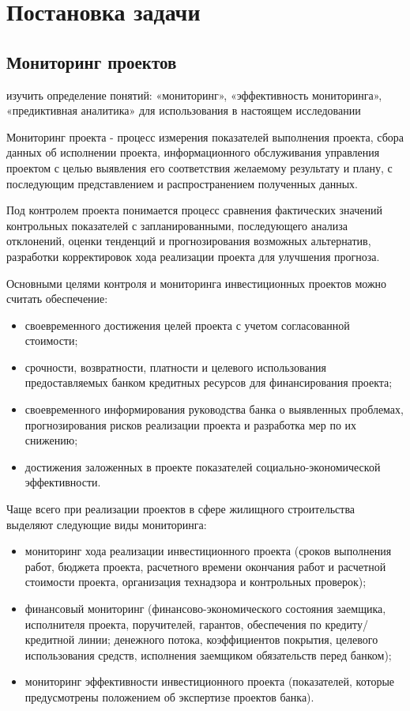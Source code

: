 \documentclass[12pt,a4paper]{article} %
\begin{document}
\newpage
\section{Постановка задачи}


\subsection{Мониторинг проектов}\label{task}

изучить определение понятий: «мониторинг», «эффективность мониторинга», «предиктивная аналитика» для использования в настоящем исследовании

Мониторинг проекта - процесс измерения показателей выполнения проекта, сбора данных об исполнении проекта, информационного обслуживания управления проектом с целью выявления его соответствия желаемому результату и плану, с последующим представлением и распространением полученных данных.

Под контролем проекта понимается процесс сравнения фактических значений контрольных показателей с запланированными, последующего анализа отклонений, оценки тенденций и прогнозирования возможных альтернатив, разработки корректировок хода реализации проекта для улучшения прогноза.

Основными целями контроля и мониторинга инвестиционных проектов можно считать обеспечение:
\begin{itemize}
	\item своевременного достижения целей проекта с учетом согласованной стоимости;
	\item срочности, возвратности, платности и целевого использования предоставляемых банком кредитных ресурсов для финансирования проекта;
	\item своевременного информирования руководства банка о выявленных проблемах, прогнозирования рисков реализации проекта и разработка мер по их снижению;
	\item достижения заложенных в проекте показателей социально-экономической эффективности.  
\end{itemize}

Чаще всего при реализации проектов в сфере жилищного строительства выделяют следующие виды мониторинга:
\begin{itemize}
	\item мониторинг хода реализации инвестиционного проекта (сроков выполнения работ, бюджета проекта, расчетного времени окончания работ и расчетной стоимости проекта, организация технадзора и контрольных проверок);
	\item финансовый мониторинг (финансово-экономического состояния заемщика, исполнителя проекта, поручителей, гарантов, обеспечения по кредиту/кредитной линии; денежного потока, коэффициентов покрытия, целевого использования средств, исполнения заемщиком обязательств перед банком);
	\item мониторинг эффективности инвестиционного проекта (показателей, которые предусмотрены положением об экспертизе проектов банка).
\end{itemize}
\end{document}
